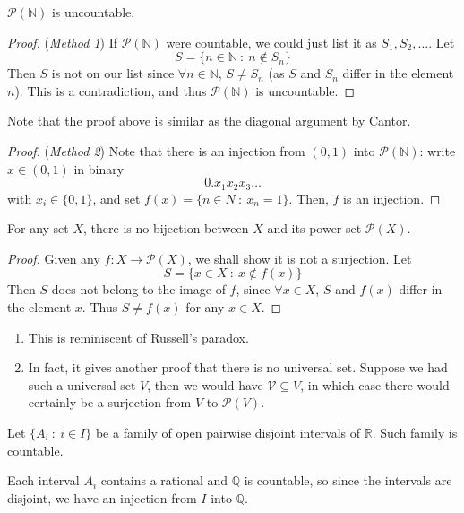 \documentclass[10pt, a4paper, twoside]{report}
\begin{document}
\begin{theorem}
    \(\mathcal{P}(\mathbb{N})\) is uncountable.
    \label{thm:uncountable_powern}
\end{theorem}
\begin{proof}
    (\emph{Method 1}) If \(\mathcal{P}(\mathbb{N})\) were countable, we could just list it as \(S_1,S_2,\ldots\). Let 
    \[S=\{n\in\mathbb{N}\::\:n\notin S_n\}\]
    Then \(S\) is not on our list since \(\forall n\in\mathbb{N}\), \(S\neq S_n\) (as \(S\) and \(S_n\) differ in the element \(n\)). This is a contradiction, and thus \(\mathcal{P}(\mathbb{N})\) is uncountable.
\end{proof}
Note that the proof above is similar as the diagonal argument by Cantor.
\begin{proof}
    (\emph{Method 2}) Note that there is an injection from \((0,1)\) into \(\mathcal{P}(\mathbb{N})\): write \(x\in(0,1)\) in binary 
    \[0.x_1x_2x_3\ldots\]
    with \(x_i\in\{0,1\}\), and set \(f(x)=\{n\in N\::\:x_n=1\}\). Then, \(f\) is an injection.
\end{proof}
\begin{theorem}
    For any set \(X\), there is no bijection between \(X\) and its power set \(\mathcal{P}(X)\).
\end{theorem}
\begin{proof}
    Given any \(f:X\to\mathcal{P}(X)\), we shall show it is not a surjection. Let
    \[S=\{x\in X\::\:x\notin f(x)\}\]
    Then \(S\) does not belong to the image of \(f\), since \(\forall x\in X\), \(S\) and \(f(x)\) differ in the element \(x\). Thus \(S\neq f(x)\) for any \(x\in X\).
\end{proof}
\begin{remark} \item[]
    \begin{enumerate}
        \item This is reminiscent of Russell's paradox.
        \item In fact, it gives another proof that there is no universal set. Suppose we had such a universal set \(V\), then we would have \(\mathcal{V}\subseteq V\), in which case there would certainly be a surjection from \(V\) to \(\mathcal{P}(V)\).
    \end{enumerate}
\end{remark}
\begin{example}
    Let \(\{A_i\::\:i\in I\}\) be a family of open pairwise disjoint intervals of \(\mathbb{R}\). Such family is countable. 

    Each interval \(A_i\) contains a rational and \(\mathbb{Q}\) is countable, so since the intervals are disjoint, we have an injection from \(I\) into \(\mathbb{Q}\).
    \label{eg:disjoint_countable}
\end{example}
\end{document}
